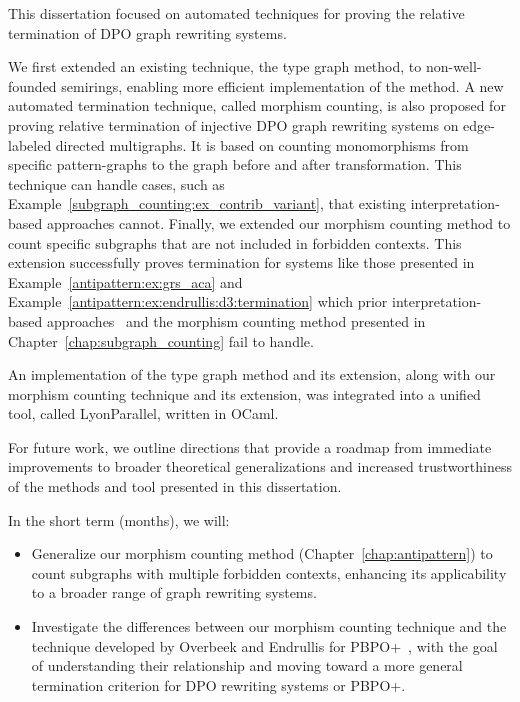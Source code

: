This dissertation focused on automated techniques for proving the relative termination of DPO graph rewriting systems.

We first extended an existing technique, the type graph method, to non-well-founded semirings, enabling more efficient implementation of the method.
A new automated termination technique, called morphism counting, is also proposed for proving relative termination of injective DPO graph rewriting systems on edge-labeled directed multigraphs. It is based on counting monomorphisms from specific pattern-graphs to the graph before and after transformation. This technique can handle cases, such as Example~\ref{subgraph_counting:ex_contrib_variant}, that existing interpretation-based approaches cannot.
Finally, we extended our morphism counting method to count specific subgraphs that are not included in forbidden contexts. This extension successfully proves termination for systems like those presented
in Example~\ref{antipattern:ex:grs_aca} and Example~\ref{antipattern:ex:endrullis:d3:termination} which prior interpretation-based approaches~\cite{zantema2014termination,bruggink2014termination,bruggink2015proving,endrullis2024generalized_arxiv_v2,overbeek2024termination_lmcs} and the morphism counting method presented in Chapter~\ref{chap:subgraph_counting} fail to handle.

An implementation of the type graph method and its extension, along with our morphism counting technique and its extension, was integrated into a unified tool, called LyonParallel, written in OCaml.

For future work, we outline directions that provide a roadmap from immediate improvements to broader theoretical generalizations and increased trustworthiness of the methods and tool presented in this dissertation.

In the short term (months), we will:
    \begin{itemize}
      \item Generalize our morphism counting method (Chapter~\ref{chap:antipattern}) to count subgraphs with multiple forbidden contexts, enhancing its applicability to a broader range of graph rewriting systems.
      \item Investigate the differences between our morphism counting technique and the technique developed by Overbeek and Endrullis for PBPO+~\cite{overbeek2024termination_lmcs}, with the goal of understanding their relationship and moving toward a more general termination criterion for DPO rewriting systems or PBPO+.
    \end{itemize}

